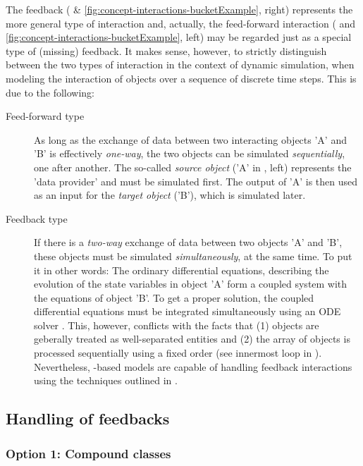 The feedback ( \& \ref{fig:concept-interactions-bucketExample}, right) represents the more general type of interaction and, actually, the feed-forward interaction ( and \ref{fig:concept-interactions-bucketExample}, left) may be regarded just as a special type of (missing) feedback. It makes sense, however, to strictly distinguish between the two types of interaction in the context of dynamic simulation, \ie{} when modeling the interaction of objects over a sequence of discrete time steps. This is due to the following:

\begin{description}
  \item [Feed-forward type] As long as the exchange of data between two interacting objects 'A' and 'B' is effectively \emph{one-way}, the two objects can be simulated \emph{sequentially}, \ie{} one after another. The so-called \emph{source object} ('A' in , left) represents the 'data provider' and must be simulated first. The output of 'A' is then used as an input for the \emph{target object} ('B'), which is simulated later.
  \item [Feedback type] If there is a \emph{two-way} exchange of data between two objects 'A' and 'B', these objects must be simulated \emph{simultaneously}, \ie{} at the same time. To put it in other words: The ordinary differential equations, describing the evolution of the state variables in object 'A' form a coupled system with the equations of object 'B'. To get a proper solution, the coupled differential equations must be integrated simultaneously using an ODE solver \citep[see \eg{}][]{Press2002}. This, however, conflicts with the facts that (1) objects are geberally treated as well-separated entities and (2) the array of objects is processed sequentially using a fixed order (see innermost loop in ). Nevertheless, -based models are capable of handling feedback interactions using the techniques outlined in .
\end{description}

\subsection{Handling of feedbacks} \label{sec:concept-interactions-feedbackHandling}

\subsubsection*{Option 1: Compound classes}

